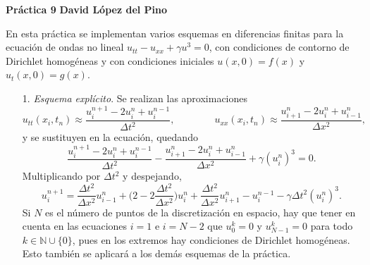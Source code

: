 \documentclass[a4paper, 11pt, oneside]{report}
\begin{document}
\noindent \textbf{Práctica 9} \hfill \textbf{David López del Pino}

\hfill

En esta práctica se implementan varios esquemas en diferencias finitas para la ecuación de ondas no lineal $u_{tt}-u_{xx}+\gamma u^3 = 0$, con condiciones de contorno de Dirichlet homogéneas y con condiciones iniciales $u(x,0) = f(x)$ y $u_t(x,0) = g(x)$.

\begin{itemize}
    \item[1.] \emph{Esquema explícito}. Se realizan las aproximaciones 
    \[u_{tt}(x_i,t_n) \approx \frac{u_i^{n+1}-2u_i^n + u_i^{n-1}}{\Delta t^2}, \qquad \qquad u_{xx}(x_i,t_n) \approx \frac{u_{i+1}^n - 2u_i^n + u_{i-1}^n}{\Delta x^2},\]
    y se sustituyen en la ecuación, quedando
    \[\frac{u_i^{n+1}-2u_i^n + u_i^{n-1}}{\Delta t^2}-\frac{u_{i+1}^n - 2u_i^n + u_{i-1}^n}{\Delta x^2}+\gamma (u_i^n)^3 = 0.\]
    Multiplicando por $\Delta t^2$ y despejando,
    \[u_i^{n+1} = \frac{\Delta t^2}{\Delta x^2}u_{i-1}^n+ \bigl(2-2\frac{\Delta t^2}{\Delta x^2}\bigr)u_i^n + \frac{\Delta t^2}{\Delta x^2}u_{i+1}^n -u_i^{n-1} - \gamma \Delta t^2(u_i^n)^3.\]
    Si $N$ es el número de puntos de la discretización en espacio, hay que tener en cuenta en las ecuaciones $i = 1$ e $i = N-2$ que $u_0^{k} = 0$ y $u_{N-1}^k = 0$ para todo $k \in \mathbb{N} \cup \{0\}$, pues en los extremos hay condiciones de Dirichlet homogéneas. Esto también se aplicará a los demás esquemas de la práctica.


\end{itemize}
\end{document}
